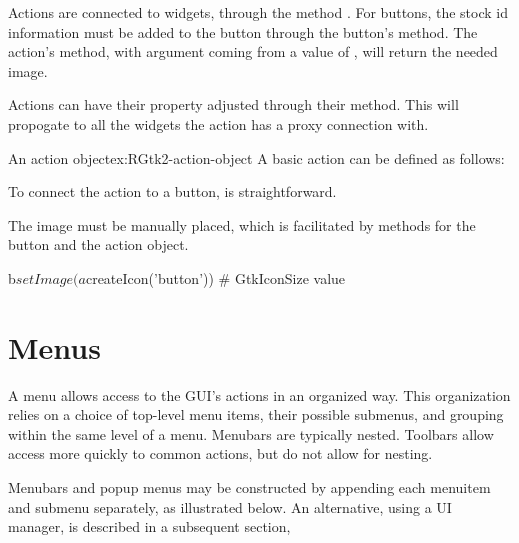 Actions are connected to widgets, through the method
. For buttons, the stock id
information must be added to the button through the button's
 method. The action's 
method, with argument coming from a value of , will
return the needed image.

Actions can have their  property adjusted through
their  method. This will propogate to
all the widgets the action has a proxy connection with.


\begin{example}{An action object}{ex:RGtk2-action-object}
A basic action can be defined as follows:
\begin{Schunk}
\end{Schunk}
To connect the action to a button, is straightforward.
\begin{Schunk}
\end{Schunk}

The image must be manually placed, which is facilitated by methods for
the button and the action object.
\begin{Schunk}
\begin{Sinput}
 b$setImage(a$createIcon('button')) # GtkIconSize value
\end{Sinput}
\end{Schunk}

\end{example}
\section{Menus}
\label{sec:RGtk2:menus}

A menu allows access to the GUI's actions in an organized way. This
organization relies on a choice of top-level menu items, their
possible submenus, and grouping within the same level of a
menu. Menubars are typically nested. Toolbars allow access more
quickly to common actions, but do not allow for nesting.

Menubars and popup menus  may be constructed by appending each menuitem
and submenu separately, as illustrated below. An alternative, using a
UI manager, is described in a subsequent section,

